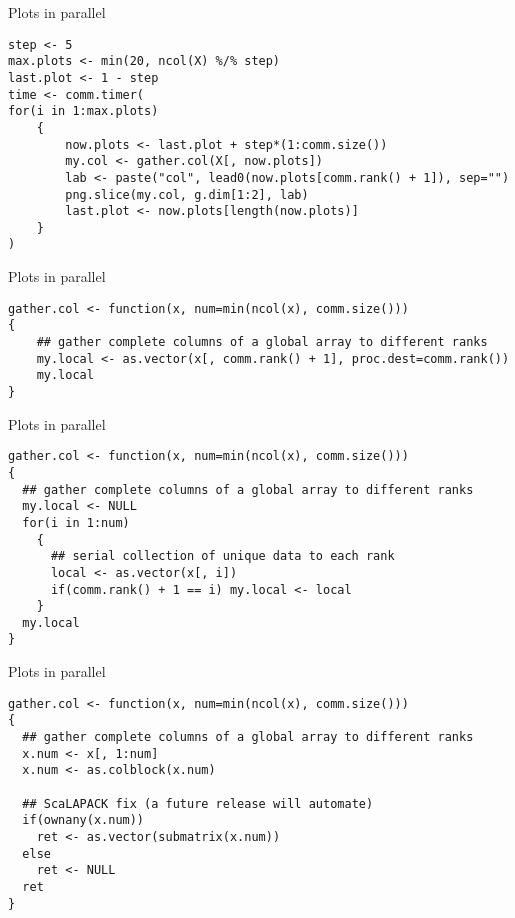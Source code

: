 \begin{frame}
  \begin{exampleblock}{Plots in parallel}\pause
\begin{lstlisting}[title=Make comm.size() plots in parallel]
step <- 5
max.plots <- min(20, ncol(X) %/% step)
last.plot <- 1 - step
time <- comm.timer(
for(i in 1:max.plots)
    {
        now.plots <- last.plot + step*(1:comm.size())
        my.col <- gather.col(X[, now.plots])
        lab <- paste("col", lead0(now.plots[comm.rank() + 1]), sep="")
        png.slice(my.col, g.dim[1:2], lab)
        last.plot <- now.plots[length(now.plots)]
    }
)
\end{lstlisting}
  \end{exampleblock}
\end{frame}

\begin{frame}
  \begin{exampleblock}{Plots in parallel}\pause
\begin{lstlisting}[title=gather.col First Attempt (p0\_plot.r)]
gather.col <- function(x, num=min(ncol(x), comm.size()))
{
    ## gather complete columns of a global array to different ranks
    my.local <- as.vector(x[, comm.rank() + 1], proc.dest=comm.rank())
    my.local
}
\end{lstlisting}
  \end{exampleblock}
\end{frame}

\begin{frame}
  \begin{exampleblock}{Plots in parallel}\pause
\begin{lstlisting}[title=gather.col Second Attempt (p1\_plot.r)]
gather.col <- function(x, num=min(ncol(x), comm.size()))
{
  ## gather complete columns of a global array to different ranks
  my.local <- NULL
  for(i in 1:num)
    {
      ## serial collection of unique data to each rank
      local <- as.vector(x[, i])
      if(comm.rank() + 1 == i) my.local <- local
    }
  my.local
}
\end{lstlisting}
  \end{exampleblock}
\end{frame}

\begin{frame}
  \begin{exampleblock}{Plots in parallel}\pause
\begin{lstlisting}[title=gather.col The Right Way (p2\_plot.r)]
gather.col <- function(x, num=min(ncol(x), comm.size()))
{
  ## gather complete columns of a global array to different ranks
  x.num <- x[, 1:num]
  x.num <- as.colblock(x.num)

  ## ScaLAPACK fix (a future release will automate)
  if(ownany(x.num))
    ret <- as.vector(submatrix(x.num))
  else
    ret <- NULL
  ret
}
\end{lstlisting}
  \end{exampleblock}
\end{frame}


